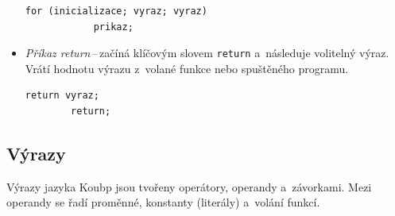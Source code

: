 \begin{itemize}
\begin{lstlisting}[language=Koubp]
        for (inicializace; vyraz; vyraz) 
            prikaz;
    \end{lstlisting}
    \item \emph{Příkaz return}\,--\,začíná klíčovým slovem \texttt{return} a~následuje volitelný výraz.
    Vrátí hodnotu výrazu z~volané funkce nebo spuštěného programu.
    \begin{lstlisting}[language=Koubp]
        return vyraz;
        return;
    \end{lstlisting}
\end{itemize}

\subsection*{Výrazy}
Výrazy jazyka Koubp jsou tvořeny operátory, operandy a~závorkami.
Mezi operandy se řadí proměnné, konstanty (literály) a~volání funkcí.

